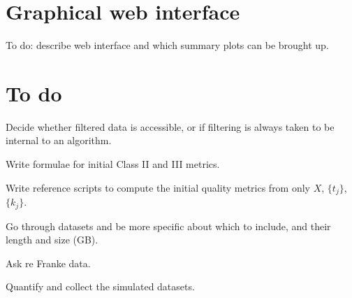 \documentclass[10pt]{article}
\begin{document}
\section{Graphical web interface}

To do: describe web interface and which summary plots can be brought up.


\section{To do}

Decide whether filtered data is accessible, or if filtering is always
taken to be internal to an algorithm.

Write formulae for initial Class II and III metrics.

Write reference scripts to compute the initial quality metrics from only
$X$, $\{t_j\}$, $\{k_j\}$.

Go through datasets and be more specific about which to include, and their
length and size (GB).

Ask re Franke data.

Quantify and collect the simulated datasets.




\end{document}
